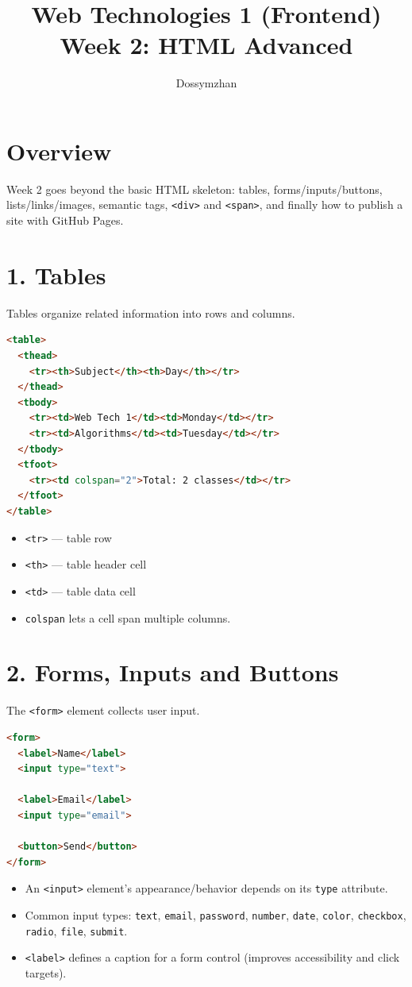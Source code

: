 \documentclass[12pt]{article}
\title{Web Technologies 1 (Frontend) \\ Week 2: HTML Advanced}
\author{Dossymzhan}
\date{}
\begin{document}
\maketitle

\section{Overview}
Week 2 goes beyond the basic HTML skeleton: tables, forms/inputs/buttons, lists/links/images, semantic tags, \texttt{<div>} and \texttt{<span>}, and finally how to publish a site with GitHub Pages.

\section{1. Tables}
Tables organize related information into rows and columns.
\begin{lstlisting}[language=HTML]
<table>
  <thead>
    <tr><th>Subject</th><th>Day</th></tr>
  </thead>
  <tbody>
    <tr><td>Web Tech 1</td><td>Monday</td></tr>
    <tr><td>Algorithms</td><td>Tuesday</td></tr>
  </tbody>
  <tfoot>
    <tr><td colspan="2">Total: 2 classes</td></tr>
  </tfoot>
</table>
\end{lstlisting}
\begin{itemize}
    \item \texttt{<tr>} — table row
    \item \texttt{<th>} — table header cell
    \item \texttt{<td>} — table data cell
    \item \texttt{colspan} lets a cell span multiple columns.
\end{itemize}

\section{2. Forms, Inputs and Buttons}
The \texttt{<form>} element collects user input.
\begin{lstlisting}[language=HTML]
<form>
  <label>Name</label>
  <input type="text">

  <label>Email</label>
  <input type="email">

  <button>Send</button>
</form>
\end{lstlisting}
\begin{itemize}
    \item An \texttt{<input>} element's appearance/behavior depends on its \texttt{type} attribute.
    \item Common input types: \texttt{text}, \texttt{email}, \texttt{password}, \texttt{number}, \texttt{date}, \texttt{color}, \texttt{checkbox}, \texttt{radio}, \texttt{file}, \texttt{submit}.
    \item \texttt{<label>} defines a caption for a form control (improves accessibility and click targets).
\end{itemize}
\end{document}
